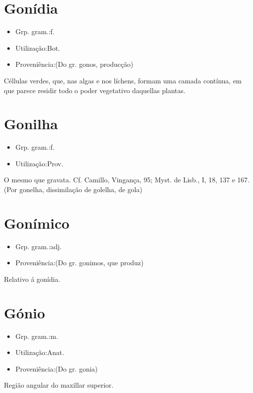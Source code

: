 \section{Gonídia}
\begin{itemize}
\item {Grp. gram.:f.}
\end{itemize}
\begin{itemize}
\item {Utilização:Bot.}
\end{itemize}
\begin{itemize}
\item {Proveniência:(Do gr. \textunderscore gonos\textunderscore , producção)}
\end{itemize}
Céllulas verdes, que, nas algas e nos líchens, formam uma camada contínua, em que parece residir todo o poder vegetativo daquellas plantas.
\section{Gonilha}
\begin{itemize}
\item {Grp. gram.:f.}
\end{itemize}
\begin{itemize}
\item {Utilização:Prov.}
\end{itemize}
O mesmo que \textunderscore gravata\textunderscore . Cf. Camillo, \textunderscore Vingança\textunderscore , 95; \textunderscore Myst. de Lisb\textunderscore ., I, 18, 137 e 167.
(Por \textunderscore gonelha\textunderscore , dissimilação de \textunderscore golelha\textunderscore , de \textunderscore gola\textunderscore )
\section{Gonímico}
\begin{itemize}
\item {Grp. gram.:adj.}
\end{itemize}
\begin{itemize}
\item {Proveniência:(Do gr. \textunderscore gonimos\textunderscore , que produz)}
\end{itemize}
Relativo á gonídia.
\section{Gónio}
\begin{itemize}
\item {Grp. gram.:m.}
\end{itemize}
\begin{itemize}
\item {Utilização:Anat.}
\end{itemize}
\begin{itemize}
\item {Proveniência:(Do gr. \textunderscore gonia\textunderscore )}
\end{itemize}
Região angular do maxillar superior.
